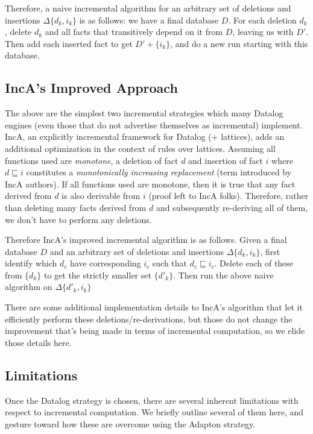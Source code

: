 \documentclass[acmlarge,anonymous]{acmart}\settopmatter{printfolios=true}
\begin{document}
Therefore, a naive incremental algorithm for an arbitrary set of deletions and insertions $\Delta\{d_k, i_k\}$ is as follows: we have a final database $D$. For each deletion $d_k$ , delete $d_k$ and all facts that transitively depend on it from $D$, leaving us with $D'$. Then add each inserted fact to get $D' + \{i_k\}$, and do a new run starting with this database.

\subsection{IncA's Improved Approach}

The above are the simplest two incremental strategies which many Datalog engines (even those that do not advertise themselves as incremental) implement. IncA, an explicitly incremental framework for Datalog (+ lattices), adds an additional optimization in the context of rules over lattices. Assuming all functions used are \textit{monotone}, a deletion of fact $d$ and insertion of fact $i$ where $d \sqsubseteq i$ constitutes a \textit{monotonically increasing replacement} (term introduced by IncA authors). If all functions used are monotone, then it is true that any fact derived from $d$ is also derivable from $i$ (proof left to IncA folks). Therefore, rather than deleting many facts derived from $d$ and subsequently re-deriving all of them, we don't have to perform any deletions.

Therefore IncA's improved incremental algorithm is as follows. Given a final database $D$ and an arbitrary set of deletions and insertions $\Delta\{d_k, i_k\}$, first identify which $d_c$ have corresponding $i_c$ such that $d_c \sqsubseteq i_c$. Delete each of these from $\{d_k\}$ to get the strictly smaller set $\{d'_k\}$. Then run the above naive algorithm on $\Delta\{d'_k, i_k\}$

There are some additional implementation details to IncA's algorithm that let it efficiently perform these deletions/re-derivations, but those do not change the improvement that's being made in terms of incremental computation, so we elide those details here.

\subsection{Limitations}

Once the Datalog strategy is chosen, there are several inherent limitations with respect to incremental computation. We briefly outline several of them here, and gesture toward how these are overcome using the Adapton strategy.\\
\end{document}
